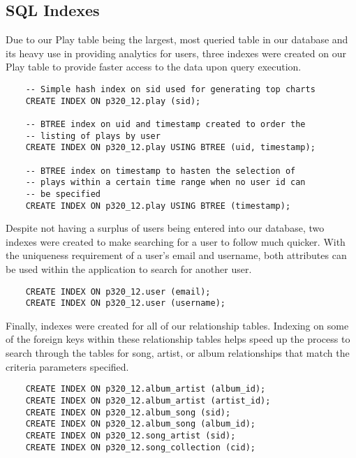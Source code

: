 \documentclass[12pt]{article}
\begin{document}
    \subsection{SQL Indexes}
    
    Due to our Play table being the largest, most queried table in
    our database and its heavy use in providing analytics for users,
    three indexes were created on our Play table to
    provide faster access to the data upon query execution.


    \begin{lstlisting}
    -- Simple hash index on sid used for generating top charts
    CREATE INDEX ON p320_12.play (sid);

    -- BTREE index on uid and timestamp created to order the
    -- listing of plays by user
    CREATE INDEX ON p320_12.play USING BTREE (uid, timestamp);

    -- BTREE index on timestamp to hasten the selection of
    -- plays within a certain time range when no user id can
    -- be specified
    CREATE INDEX ON p320_12.play USING BTREE (timestamp);
    \end{lstlisting}

    \noindent Despite not having a surplus of users being entered into our database,
    two indexes were created to make searching for a user to follow much quicker.
    With the uniqueness requirement of a user's email and username, both attributes
    can be used within the application to search for another user.
    \begin{lstlisting}
    CREATE INDEX ON p320_12.user (email);
    CREATE INDEX ON p320_12.user (username);
    \end{lstlisting}

    \noindent Finally, indexes were created for all of our relationship tables.
    Indexing on some of the foreign keys within these relationship tables
    helps speed up the process to search through the tables for song, artist,
    or album relationships that match the criteria parameters specified.
    \begin{lstlisting}
    CREATE INDEX ON p320_12.album_artist (album_id);
    CREATE INDEX ON p320_12.album_artist (artist_id);
    CREATE INDEX ON p320_12.album_song (sid);
    CREATE INDEX ON p320_12.album_song (album_id);
    CREATE INDEX ON p320_12.song_artist (sid);
    CREATE INDEX ON p320_12.song_collection (cid);
    \end{lstlisting}
\end{document}
